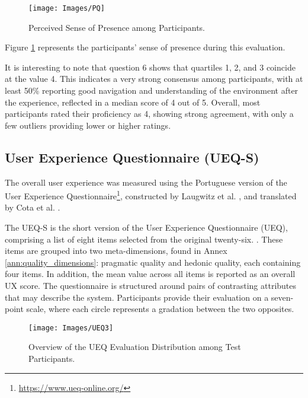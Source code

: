 \begin{figure}[h!]
    \centering
    \texttt{[image: Images/PQ]}
    \caption{Perceived Sense of Presence among Participants.} 
    \label{fig:PQ}
\end{figure}

Figure \ref{fig:PQ} represents the participants’ sense of presence during this evaluation.

It is interesting to note that question 6 shows that quartiles 1, 2, and 3 coincide at the value 4. 
This indicates a very strong consensus among participants, with at least 50\% reporting good navigation and understanding of the environment after the experience, reflected in a median score of 4 out of 5. 
Overall, most participants rated their proficiency as 4, showing strong agreement, with only a few outliers providing lower or higher ratings.

\subsection{User Experience Questionnaire (UEQ-S)}

The overall user experience was measured using the Portuguese version of the User Experience Questionnaire\footnote{\url{https://www.ueq-online.org/}}, constructed by Laugwitz et al. \cite{inproceedings}, and translated by Cota et al. \cite{article_t}.

The UEQ-S is the short version of the User Experience Questionnaire (UEQ), comprising a list of eight items selected from the original twenty-six. \cite{article_ueq}. These items are grouped into two meta-dimensions, found in Annex \ref{ann:quality_dimensions}: pragmatic quality and hedonic quality, each containing four items.
In addition, the mean value across all items is reported as an overall \gls{UX} score.
The questionnaire is structured around pairs of contrasting attributes that may describe the system. Participants provide their evaluation on a seven-point scale, where each circle represents a gradation between the two opposites.

\begin{figure}[h!]
    \centering
    \texttt{[image: Images/UEQ3]}
    \caption{Overview of the \gls{UEQ} Evaluation Distribution among Test Participants.} 
    \label{fig:UEQ2}
\end{figure}


